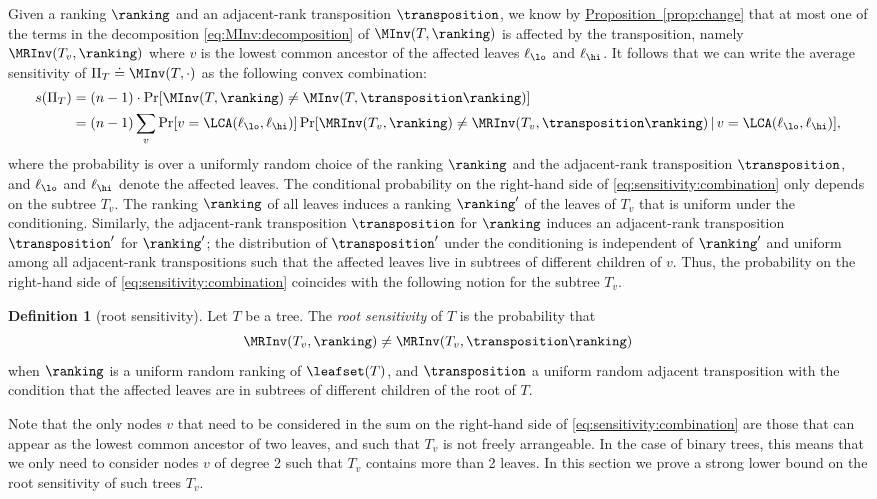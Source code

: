 \documentclass[11pt]{article}
\numberwithin{equation}{section}
\theoremstyle{definition}
\newtheorem{definition}[theorem]{Definition}
\theoremstyle{plain}
\newcommand{\expref}[2]{\hyperref[#2]{#1~\ref{#2}}}
\begin{document}
Given a ranking $\ranking$ and an adjacent-rank transposition $\transposition$, we know by \expref{Proposition}{prop:change} that at most one of the terms in the decomposition \eqref{eq:MInv:decomposition} of $\MInv(T,\ranking)$ is affected by the transposition, namely $\MRInv(T_v,\ranking)$ where $v$ is the lowest common ancestor of the affected leaves $\ell_\lo$ and $\ell_\hi$. It follows that we can write the average sensitivity of $\Pi_T \doteq \MInv(T,\cdot)$ as the following convex combination:
\begin{align}\label{eq:sensitivity:combination}
s(\Pi_T) & = (n-1) \cdot \Pr[ \MInv(T,\ranking) \ne \MInv(T,\transposition \ranking)] \nonumber \\
& = (n-1) \sum_v \Pr[ v = \LCA(\ell_\lo,\ell_\hi) ] \Pr[ \MRInv(T_v,\ranking) \ne \MRInv(T_v,\transposition \ranking) \, | \, 
v = \LCA(\ell_\lo,\ell_\hi)], 
\end{align}
where the probability is over a uniformly random choice of the ranking $\ranking$ and the adjacent-rank transposition $\transposition$, and $\ell_\lo$ and $\ell_\hi$ denote the affected leaves. The conditional probability on the right-hand side of \eqref{eq:sensitivity:combination} only depends on the subtree $T_v$. The ranking $\ranking$ of all leaves induces a ranking $\ranking'$ of the leaves of $T_v$ that is uniform under the conditioning. Similarly, the adjacent-rank transposition $\transposition$ for $\ranking$ induces an adjacent-rank transposition $\transposition'$ for $\ranking'$; the distribution of $\transposition'$ under the conditioning is independent of $\ranking'$ and uniform among all adjacent-rank transpositions such that the affected leaves live in subtrees of different children of $v$. Thus, the probability on the right-hand side of \eqref{eq:sensitivity:combination} coincides with the following notion for the subtree $T_v$.
\begin{definition}[root sensitivity]\label{def:root-sensitivity}
Let $T$ be a tree. The \emph{root sensitivity} of $T$ is the probability that 
\[\MRInv(T_v,\ranking) \ne \MRInv(T_v,\transposition \ranking)\] 
when $\ranking$ is a uniform random  ranking of $\leafset(T)$, and $\transposition$ a uniform random adjacent transposition with the condition that the affected leaves are in subtrees of different children of the root of $T$.
\end{definition}
Note that the only nodes $v$ that need to be considered in the sum  on the right-hand side of \eqref{eq:sensitivity:combination} are those that can appear as the lowest common ancestor of two leaves, and such that $T_v$ is not freely arrangeable. In the case of binary trees, this means that we only need to consider nodes $v$ of degree 2 such that $T_v$ contains more than 2 leaves. In this section we prove a strong lower bound on the root sensitivity of such trees $T_v$.
\end{document}
